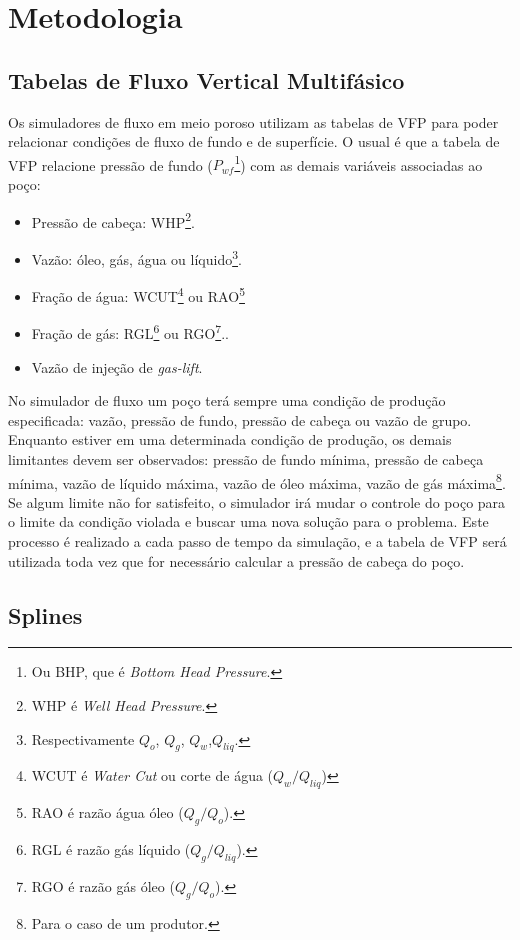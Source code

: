 \documentclass[final,5p]{elsarticle}
\numberwithin{equation}{section}
\begin{document}
\section{Metodologia}

    \subsection{Tabelas de Fluxo Vertical Multifásico}

        Os simuladores de fluxo em meio poroso utilizam as tabelas de VFP para poder relacionar condições de fluxo de fundo e de superfície. O usual é que a tabela de VFP relacione pressão de fundo ($P_{wf}$\footnote{Ou BHP, que é \emph{Bottom Head Pressure}.}) com as demais variáveis associadas ao poço: 
        
        \begin{itemize}
            \item Pressão de cabeça: WHP\footnote{WHP é \emph{Well Head Pressure}.}.
            \item Vazão: óleo, gás, água ou líquido\footnote{Respectivamente $Q_o$, $Q_g$, $Q_w$,$Q_{liq}$.}.
            \item Fração de água: WCUT\footnote{WCUT é \emph{Water Cut} ou corte de água ($Q_w/Q_{liq}$)} ou RAO\footnote{RAO é razão água óleo ($Q_g/Q_o$).}
            \item Fração de gás: RGL\footnote{RGL é razão gás líquido ($Q_g/Q_{liq}$).} ou RGO\footnote{RGO é razão gás óleo ($Q_g/Q_o$).}..
            \item Vazão de injeção de \emph{gas-lift}.
        \end{itemize}

        No simulador de fluxo um poço terá sempre uma condição de produção especificada: vazão, pressão de fundo, pressão de cabeça ou vazão de grupo. Enquanto estiver em uma determinada condição de produção, os demais limitantes devem ser observados: pressão de fundo mínima, pressão de cabeça mínima, vazão de líquido máxima, vazão de óleo máxima, vazão de gás máxima\footnote{Para o caso de um produtor.}. Se algum limite não for satisfeito, o simulador irá mudar o controle do poço para o limite da condição violada e buscar uma nova solução para o problema. Este processo é realizado a cada passo de tempo da simulação, e a tabela de VFP será utilizada toda vez que for necessário calcular a pressão de cabeça do poço.

    \subsection{Splines}
    
\end{document}
